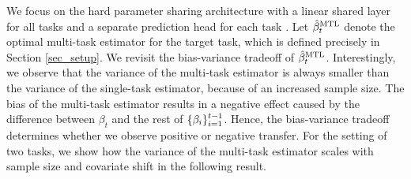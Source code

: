 We focus on the hard parameter sharing architecture with a linear shared layer for all tasks and a separate prediction head for each task \cite{R17,WZR20,MTDNN19}.
Let $\hat{\beta}_t^{\text{MTL}}$ denote the optimal multi-task estimator for the target task, which is defined precisely in Section \ref{sec_setup}.
We revisit the bias-variance tradeoff of $\hat{\beta}_t^{\text{MTL}}$.
Interestingly, we observe that the variance of the multi-task estimator is always smaller than the variance of the single-task estimator, because of an increased sample size.
The bias of the multi-task estimator results in a negative effect caused by the difference between $\beta_t$ and the rest of $\{\beta_i\}_{i=1}^{t-1}$.
Hence, the bias-variance tradeoff determines whether we observe positive or negative transfer.
For the setting of two tasks, we show how the variance of the multi-task estimator  scales with sample size and covariate shift in the following result.

